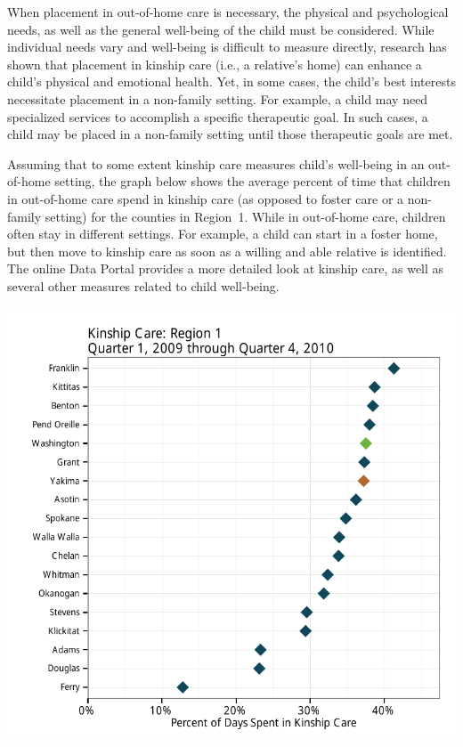 \documentclass{article}\usepackage[]{graphicx}\usepackage[]{color}
\makeatletter
\def\maxwidth{ %
  \ifdim\Gin@nat@width>\linewidth
    \linewidth
  \else
    \Gin@nat@width
  \fi
}
\newenvironment{knitrout}{}{} %
\makeatother
\begin{document}
When placement in out-of-home care is necessary, the physical and psychological needs, as well as the general well-being of the child must be considered. While individual needs vary and well-being is difficult to measure directly, research has shown that placement in kinship care (i.e., a relative's home) can enhance a child's physical and emotional health. Yet, in some cases, the child's best interests necessitate placement in a non-family setting. For example, a child may need specialized services to accomplish a specific therapeutic goal. In such cases, a child may be placed in a non-family setting until those therapeutic goals are met.

Assuming that to some extent kinship care measures child's well-being in an out-of-home setting, the graph below shows the average percent of time that children in out-of-home care spend in kinship care (as opposed to foster care or a non-family setting) for the counties in Region~1. While in out-of-home care, children often stay in different settings. For example, a child can start in a foster home, but then move to kinship care as soon as a willing and able relative is identified. The online Data Portal provides a more detailed look at kinship care, as well as several other measures related to child well-being.


\nopagebreak[3]
\begin{knitrout}
\color{fgcolor}

{\centering \includegraphics[width=\maxwidth]{figure/ooh_wb} 

}



\end{knitrout}
\end{document}
